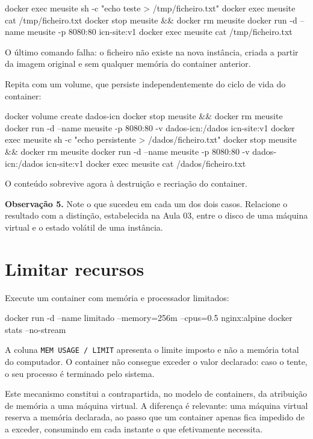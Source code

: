 \documentclass[11pt,a4paper]{article}
\begin{document}
\begin{terminal}
docker exec meusite sh -c "echo teste > /tmp/ficheiro.txt"
docker exec meusite cat /tmp/ficheiro.txt
docker stop meusite && docker rm meusite
docker run -d --name meusite -p 8080:80 icn-site:v1
docker exec meusite cat /tmp/ficheiro.txt
\end{terminal}

O último comando falha: o ficheiro não existe na nova instância, criada a partir da imagem original e sem qualquer memória do container anterior.

Repita com um volume, que persiste independentemente do ciclo de vida do container:

\begin{terminal}
docker volume create dados-icn
docker stop meusite && docker rm meusite
docker run -d --name meusite -p 8080:80 -v dados-icn:/dados icn-site:v1
docker exec meusite sh -c "echo persistente > /dados/ficheiro.txt"
docker stop meusite && docker rm meusite
docker run -d --name meusite -p 8080:80 -v dados-icn:/dados icn-site:v1
docker exec meusite cat /dados/ficheiro.txt
\end{terminal}

O conteúdo sobrevive agora à destruição e recriação do container.

\begin{registo}
\textbf{Observação 5.} Note o que sucedeu em cada um dos dois casos. Relacione o resultado com a distinção, estabelecida na Aula 03, entre o disco de uma máquina virtual e o estado volátil de uma instância.
\end{registo}

\section{Limitar recursos}

Execute um container com memória e processador limitados:

\begin{terminal}
docker run -d --name limitado --memory=256m --cpus=0.5 nginx:alpine
docker stats --no-stream
\end{terminal}

A coluna \texttt{MEM USAGE / LIMIT} apresenta o limite imposto e não a memória total do computador. O container não consegue exceder o valor declarado: caso o tente, o seu processo é terminado pelo sistema.

Este mecanismo constitui a contrapartida, no modelo de containers, da atribuição de memória a uma máquina virtual. A diferença é relevante: uma máquina virtual reserva a memória declarada, ao passo que um container apenas fica impedido de a exceder, consumindo em cada instante o que efetivamente necessita.
\end{document}
